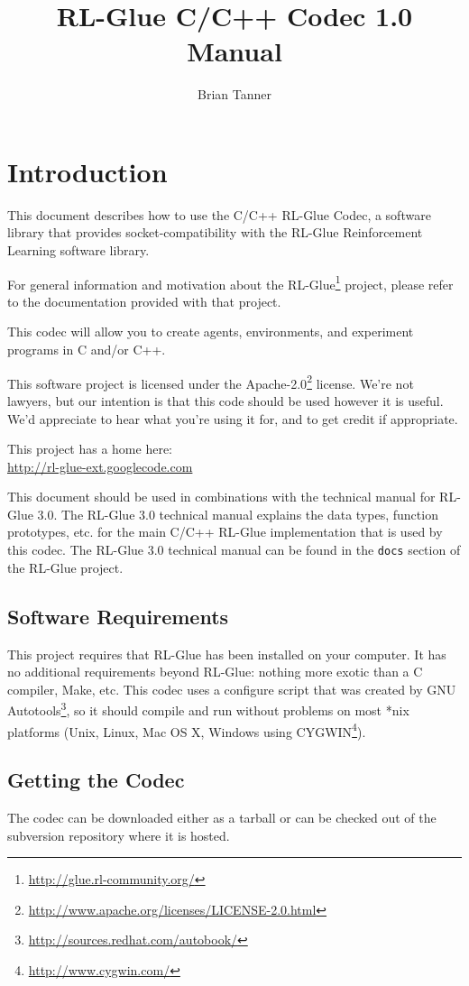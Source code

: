 \documentclass[11pt]{article}
\title{RL-Glue C/C++ Codec 1.0 Manual }
\author{Brian Tanner}
\date{}
\begin{document}
\maketitle
\tableofcontents

\section{Introduction}

This document describes how to use the C/C++ RL-Glue Codec, a software library that provides socket-compatibility with the RL-Glue Reinforcement Learning software library.  

For general information and motivation about the RL-Glue\footnote{\url{http://glue.rl-community.org/}} project, please refer to the documentation provided with that project.

This codec will allow you to create agents, environments, and experiment programs in C and/or C++.

This software project is licensed under the Apache-2.0\footnote{\url{http://www.apache.org/licenses/LICENSE-2.0.html}} license. We're not lawyers, but our intention is that this code 
should be used however it is useful.  We'd appreciate to hear what you're using it for, and to get credit if appropriate.

This project has a home here:\\
\url{http://rl-glue-ext.googlecode.com}

This document should be used in combinations with the technical manual for RL-Glue 3.0.  The RL-Glue 3.0 technical manual explains the data types, function prototypes, etc. for the main C/C++ RL-Glue implementation that is used
by this codec.  The RL-Glue 3.0 technical manual can be found in the \texttt{docs} section of the RL-Glue project.

\subsection{Software Requirements}
This project requires that RL-Glue has been installed on your computer.  It has no additional requirements beyond RL-Glue: nothing more exotic than a C compiler, Make, etc.  This codec uses a configure script that was created by GNU Autotools\footnote{\url{http://sources.redhat.com/autobook/}}, so it should compile and run without problems on most *nix platforms (Unix, Linux, Mac OS X, Windows using CYGWIN\footnote{\url{http://www.cygwin.com/}}). 

\subsection{Getting the Codec}
The codec can be downloaded either as a tarball or can be checked out of the subversion repository where it is hosted.
\end{document}
